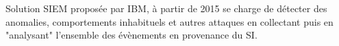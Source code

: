 Solution SIEM proposée par IBM, à partir de 2015 se charge de détecter des anomalies, comportements inhabituels et autres attaques en collectant puis en "analysant" l’ensemble des évènements en provenance du SI. 
